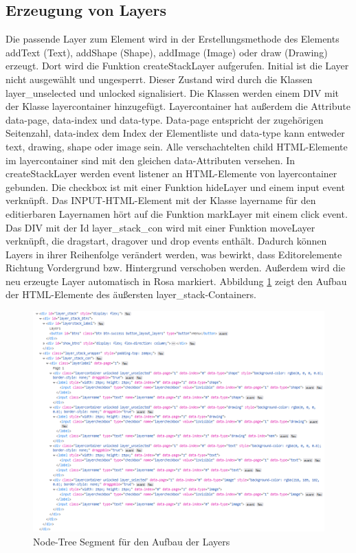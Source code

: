 \subsection{Erzeugung von Layers}
Die passende Layer zum Element wird in der Erstellungsmethode des Elements addText (Text), addShape (Shape), addImage (Image) oder draw (Drawing) erzeugt. Dort wird die Funktion  createStackLayer aufgerufen. Initial ist die Layer nicht ausgewählt und ungesperrt. Dieser Zustand wird durch die Klassen layer\_unselected und unlocked signalisiert. Die Klassen werden einem DIV mit der Klasse layercontainer hinzugefügt. Layercontainer hat außerdem die Attribute data-page, data-index und data-type. Data-page entspricht der zugehörigen Seitenzahl, data-index dem Index der Elementliste und data-type kann entweder text, drawing, shape oder image sein. Alle verschachtelten child HTML-Elemente im layercontainer sind mit den gleichen data-Attributen versehen. In createStackLayer werden event listener an HTML-Elemente von layercontainer gebunden. Die checkbox ist mit einer Funktion hideLayer und einem input event verknüpft. Das INPUT-HTML-Element mit der Klasse layername für den editierbaren Layernamen hört auf die Funktion markLayer mit einem click event. Das DIV mit der Id layer\_stack\_con wird mit einer Funktion moveLayer verknüpft, die dragstart, dragover und drop events enthält. Dadurch können Layers in ihrer Reihenfolge verändert werden, was bewirkt, dass Editorelemente Richtung Vordergrund bzw. Hintergrund verschoben werden. Außerdem wird die neu erzeugte Layer automatisch in Rosa markiert. Abbildung \ref{fig:layer-stack} zeigt den Aufbau der HTML-Elemente des äußersten layer\_stack-Containers.

\begin{figure}[!htbp]
	\centering
	\includegraphics[width=1\textwidth]{"images/layer-stack.png"}
	\caption{Node-Tree Segment für den Aufbau der Layers}
	\label{fig:layer-stack}
\end{figure}

